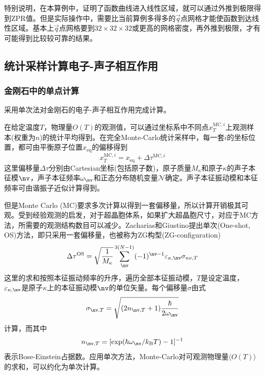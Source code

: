 特别说明，在本算例中，证明了函数曲线进入线性区域，就可以通过外推到极限得到\textrm{ZPR}值。但是实际操作中，需要比当前算例多得多的$\vec q$点网格才能使函数到达线性区域。基本上$\vec q$点网格要到$32\times32\times32$或更高的网格密度，再外推到极限，才有可能得到比较较可靠的结果。

\subsection{统计采样计算电子-声子相互作用}
\subsubsection{金刚石中的单点计算}
采用单次法对金刚石的电子-声子相互作用完成计算。

在给定温度$T$，物理量$O(T)$的观测值，可以通过坐标系中不同点$x_T^{\mathrm{MC},i}$上观测样本(权重为$n$)的统计平均得到。在完全\textrm{Monte-Carlo}统计采样中，每一套$i$的坐标位置，都可由平衡原子位置$x_{\mathrm{eq}}$的偏移得到
\begin{displaymath}
	x_T^{\mathrm{MC},i}=x_{\mathrm{eq}}+\Delta\tau^{\mathrm{MC},i}
\end{displaymath}
这里偏移量$\Delta\tau$分别由\textrm{Cartesian}坐标(包括原子数)，原子质量$M_{\kappa}$和原子$\kappa$的声子本征模$\nv$，声子本征频率$\omega_{\nv}$和正态分布随机变量$\mathcal{N}$确定。声子本征振动模和本征频率可由谐振子近似计算得到。

但是\textrm{Monte Carlo (MC)}要求多次计算以得到一套偏移量，所以计算开销极其可观。受到经验观测的启发，对于超晶胞体系，如果扩大超晶胞尺寸，对应于\textrm{MC}方法，所需要的观测结构数目可以减少。\textrm{Zacharias}和\textrm{Giustino}提出单次\textrm{(One-shot, OS)}方法，即只采用一套偏移量，也被称为\textrm{ZG}构型\textrm{(ZG-configuration)}
\begin{displaymath}
	\Delta\tau^{\mathrm{OS}}=\sqrt{\frac1{M_{\kappa}}}\sum_{\nv}^{3(N-1)}(-1)^{\nv-1}\varepsilon_{\kappa,\nv}\sigma_{nv,T}
\end{displaymath}
这里的求和按照本征振动频率的升序，遍历全部本征振动模，$T$是设定温度，$\varepsilon_{\kappa,\nv}$是原子$\kappa$上的本征振动模$\nv$的单位矢量。每个偏移量$\sigma$由式
\begin{displaymath}
	\sigma_{\nv,T}=\sqrt{(2n_{\nv,T}+1)\dfrac{\hbar}{2\omega_{\nv}}}
\end{displaymath}
计算，而其中
\begin{displaymath}
	n_{\nv,T}=[\exp(\hbar\omega_{\nv}/k_{\mathrm{B}}T)-1]^{-1}
\end{displaymath}
表示\textrm{Bose-Einstein}占据数。应用单次方法，\textrm{Monte-Carlo}对可观测物理量$\langle O(T)\rangle$的求和，可以约化为单次计算。

